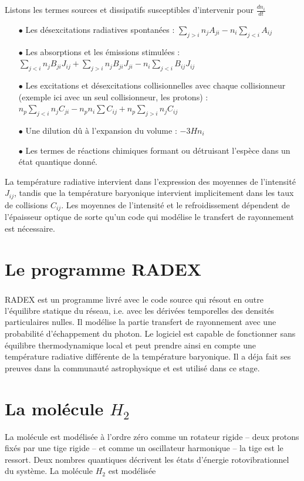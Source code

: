 \documentclass[10pt, a4paper]{report}
\numberwithin{equation}{subsection}
\begin{document}
Listons les termes sources et dissipatifs susceptibles d'intervenir pour $\frac{dn_i}{dt}$ \\

\begin{itemize}
	\item [$\bullet$] Les désexcitations radiatives spontanées : $\sum\limits_{j>i} n_jA_{ji}-n_i\sum\limits_{j<i} A_{ij}$
	\item [$\bullet$] Les absorptions et les émissions stimulées : $\sum\limits_{j<i} n_jB_{ji}J_{ij}+\sum\limits_{j>i} n_jB_{ji}J_{ji}-n_i\sum\limits_{j<i}B_{ij}J_{ij}$
	\item [$\bullet$] Les excitations et désexcitations collisionnelles avec chaque collisionneur (exemple ici avec un seul collisionneur, les protons) : $n_p\sum\limits_{j<i}n_j C_{ji}-n_pn_i\sum\limits C_{ij}+n_p\sum\limits_{j>i}n_j C_{ij}$
	\item [$\bullet$] Une dilution dû à l'expansion du volume : $-3Hn_i$\\
	\item [$\bullet$] Les termes de réactions chimiques formant ou détruisant l'espèce dans un état quantique donné.
\end{itemize}
\medskip
\normalsize
La température radiative intervient dans l'expression des moyennes de l'intensité $J_{ij}$, tandis que la température baryonique intervient implicitement dans les taux de collisions $C_{ij}$. Les moyennes de l'intensité et le refroidissement dépendent de l'épaisseur optique de sorte qu'un code qui modélise le transfert de rayonnement est nécessaire. 
\bigskip
\large 
\section{Le programme RADEX}
RADEX\textsuperscript{\cite{RADEX}} est un programme livré avec le code source qui résout en outre l'équilibre statique du réseau, i.e. avec les dérivées temporelles des densités particulaires nulles. Il modélise la partie transfert de rayonnement avec une probabilité d'échappement du photon. Le logiciel est capable de fonctionner sans équilibre thermodynamique local et peut prendre ainsi en compte une température radiative différente de la température baryonique. Il a déja fait ses preuves dans la communauté astrophysique et est utilisé dans ce stage.
\section{La molécule $H_2$}
La molécule est modélisée à l'ordre zéro comme un rotateur rigide -- deux protons fixés par une tige rigide -- et comme un oscillateur harmonique -- la tige est le ressort. Deux nombres quantiques décrivent les états d'énergie rotovibrationnel du système.  
La molécule $H_2$ est modélisée 
\end{document}
